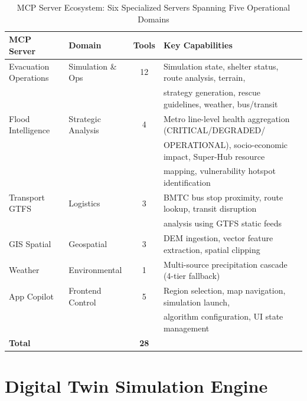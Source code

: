 \documentclass[journal]{IEEEtran}
\begin{document}
\begin{table}[!t]
    \centering
    \caption{MCP Server Ecosystem: Six Specialized Servers Spanning Five Operational Domains}
    \label{tab:mcp_servers}
    \begin{tabular}{@{}llcl@{}}
        \toprule
        \textbf{MCP Server} & \textbf{Domain} & \textbf{Tools} & \textbf{Key Capabilities} \\
        \midrule
        Evacuation Operations & Simulation \& Ops & 12 &
            Simulation state, shelter status, route analysis, terrain, \\
        & & & strategy generation, rescue guidelines, weather, bus/transit \\
        \midrule
        Flood Intelligence & Strategic Analysis & 4 &
            Metro line-level health aggregation (CRITICAL/DEGRADED/ \\
        & & & OPERATIONAL), socio-economic impact, Super-Hub resource \\
        & & & mapping, vulnerability hotspot identification \\
        \midrule
        Transport GTFS & Logistics & 3 &
            BMTC bus stop proximity, route lookup, transit disruption \\
        & & & analysis using GTFS static feeds \\
        \midrule
        GIS Spatial & Geospatial & 3 &
            DEM ingestion, vector feature extraction, spatial clipping \\
        \midrule
        Weather & Environmental & 1 &
            Multi-source precipitation cascade (4-tier fallback) \\
        \midrule
        App Copilot & Frontend Control & 5 &
            Region selection, map navigation, simulation launch, \\
        & & & algorithm configuration, UI state management \\
        \midrule
        \multicolumn{2}{l}{\textbf{Total}} & \textbf{28} & \\
        \bottomrule
    \end{tabular}
\end{table}


\section{Digital Twin Simulation Engine}
\label{sec:digitaltwin}
\end{document}
